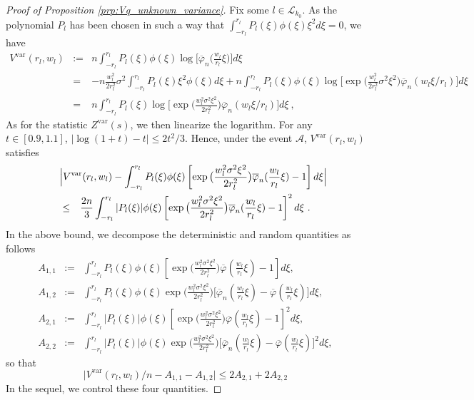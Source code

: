\documentclass[twoside,11pt]{article}
\def\beq{\begin{equation}}
\def\eeq{\end{equation}}
\def\beqn{\begin{eqnarray*}}
\def\eeqn{\end{eqnarray*}}
\def\cA{\mathcal{A}}
\def\cL{\mathcal{L}}
\newcommand{\<}{\langle}
\renewcommand{\>}{\rangle}
\begin{document}
\begin{proof}[Proof of Proposition \ref{prp:Vq_unknown_variance}]
Fix some $l\in \cL_{k_0}$. As the polynomial $P_l$ has been chosen in such a way that $\int_{-r_l}^{r_l} P_l(\xi)\phi(\xi)\xi^2d\xi=0$, we have
\beqn
V^{\mathrm{var}}(r_l,w_l)&:=&  n \int_{-r_l}^{r_l} P_l(\xi) \phi(\xi)\log\big[\overline{\varphi}_n\big(\frac{w_l}{r_l}\xi\big)\big] d\xi \\
& = &  - n\frac{w_l^2}{2r_l^2}  \sigma^2   \int_{-r_l}^{r_l} P_l(\xi) \xi^2\phi(\xi) d\xi   +  n \int_{-r_l}^{r_l} P_l(\xi)\phi(\xi) \log\big[\exp\big(\frac{w_l^2}{2r_l^2}\sigma^2\xi^2\big)\overline{\varphi}_n(w_l\xi/r_l)\big]d\xi\\
&= &  n \int_{-r_l}^{r_l} P_l(\xi) \log\big[\exp\big(\frac{w_l^2\sigma^2\xi^2}{2r_l^2}\big)\overline{\varphi}_n(w_l\xi/r_l)\big]d\xi\ ,
\eeqn 
 As for the statistic $Z^{\mathrm{var}}(s)$, we then linearize the logarithm. For any $t\in [0.9,1.1]$, $|\log(1+t)-t|\leq 2t^2/3$. Hence, under the event $\cA$,  $V^{\mathrm{var}}(r_l,w_l)$ satisfies
 \beqn 
\lefteqn{\Big|V^{\mathrm{var}}(r_l,w_l) -  \int_{-r_l}^{r_l} P_l(\xi) \phi(\xi) \left[\exp\big(\frac{w_l^2\sigma^2\xi^2}{2r_l^2}\big)\overline{\varphi}_n(\frac{w_l}{r_l}\xi)-1 \right]d\xi \Big|}&&\\& \leq& \frac{2n}{3} \int_{-r_l}^{r_l} |P_l(\xi)| \phi(\xi) \left[\exp\big(\frac{w_l^2\sigma^2\xi^2}{2r_l^2}\big)\overline{\varphi}_n(\frac{w_l}{r_l}\xi)-1 \right]^2 d\xi\ .
\eeqn
In the above bound, we decompose the deterministic and random quantities as follows
\begin{eqnarray*}
A_{1,1}&:=&   \int_{-r_l}^{r_l} P_l(\xi) \phi(\xi) \left[\exp\big(\frac{w_l^2\sigma^2\xi^2}{2r_l^2}\big)\overline{\varphi}(\frac{w_l}{r_l}\xi)- 1\right]d\xi,\\
A_{1,2}&:=&   \int_{-r_l}^{r_l} P_l(\xi) \phi(\xi) \exp\big(\frac{w_l^2\sigma^2\xi^2}{2r_l^2}\big)\big[\overline{\varphi}_n(\frac{w_l}{r_l}\xi)- \overline{\varphi}(\frac{w_l}{r_l}\xi) \big]d\xi,\\
A_{2,1}&:=&    \int_{-r_l}^{r_l} |P_l(\xi)| \phi(\xi) \left[\exp\big(\frac{w_l^2\sigma^2\xi^2}{2r_l^2}\big)\overline{\varphi}(\frac{w_l}{r_l}\xi)- 1\right]^2d\xi,\\
A_{2,2}&:=&    \int_{-r_l}^{r_l} |P_l(\xi)| \phi(\xi) \exp\big(\frac{w_l^2\sigma^2\xi^2}{2r_l^2}\big)\big[\overline{\varphi}_n(\frac{w_l}{r_l}\xi)- \overline{\varphi}(\frac{w_l}{r_l}\xi) \big]^2d\xi,
\end{eqnarray*}
so that
\beq \label{eq:decomposition_V_l}
\Big|V^{\mathrm{var}}(r_l,w_l)/n - A_{1,1}-A_{1,2}\Big|\leq  2A_{2,1} +2  A_{2,2}
\eeq
In the sequel, we control these four quantities. 
\bigskip 


\end{proof}
\end{document}
